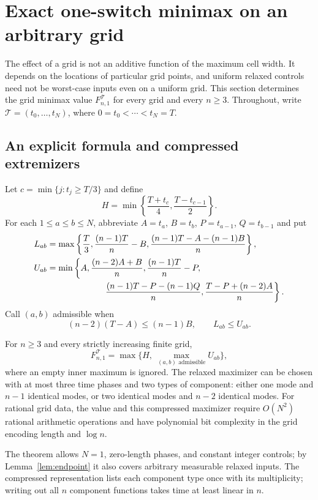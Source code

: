 \section{Exact one-switch minimax on an arbitrary grid}\label{sec:finite-one}
The effect of a grid is not an additive function of the maximum cell width.
It depends on the locations of particular grid points, and uniform relaxed
controls need not be worst-case inputs even on a uniform grid.
This section determines the grid minimax value $F^{\mathcal T}_{n,1}$ for
every grid and every $n\ge3$. Throughout, write
$\mathcal T=(t_0,\ldots,t_N)$, where $0=t_0<\cdots<t_N=T$.

\subsection{An explicit formula and compressed extremizers}
Let $c=\min\{j:t_j\ge T/3\}$ and define
\begin{equation}\label{eq:grid-H}
 H=\min\left\{\frac{T+t_c}{4},\frac{T-t_{c-1}}2\right\}.
\end{equation}
For each $1\le a\le b\le N$, abbreviate
$A=t_a$, $B=t_b$, $P=t_{a-1}$, $Q=t_{b-1}$ and put
\begin{align}
 L_{ab}&=\max\left\{\frac T3,\frac{(n-1)T}{n}-B,
                \frac{(n-1)T-A-(n-1)B}{n}\right\},\label{eq:grid-L}\\
 U_{ab}&=\min\left\{A,\frac{(n-2)A+B}{n},\frac{(n-1)T}{n}-P,\right.\notag\\
 &\hspace{23mm}\left.\frac{(n-1)T-P-(n-1)Q}{n},
          \frac{T-P+(n-2)A}{n}\right\}.\label{eq:grid-U}
\end{align}
Call $(a,b)$ admissible when
\begin{equation}\label{eq:grid-admissible}
 (n-2)(T-A)\le(n-1)B,\qquad L_{ab}\le U_{ab}.
\end{equation}

\begin{theorem}\label{thm:finite-one}
For $n\ge3$ and every strictly increasing finite grid,
\begin{equation}\label{eq:grid-minimax-formula}
 F^{\mathcal T}_{n,1}=\max\{H,\ \max_{(a,b)\text{ admissible}}U_{ab}\},
\end{equation}
where an empty inner maximum is ignored. The relaxed maximizer can be chosen
with at most three time phases and two types of component: either one
mode and $n-1$ identical modes, or two identical modes and $n-2$ identical
modes. For rational grid data, the value and this compressed maximizer
require $O(N^2)$ rational arithmetic operations and have polynomial bit
complexity in the grid encoding length and $\log n$.
\end{theorem}
The theorem allows $N=1$, zero-length phases, and constant integer controls;
by Lemma~\ref{lem:endpoint} it also covers arbitrary measurable relaxed
inputs. The compressed representation lists each component type once with
its multiplicity; writing out all $n$ component functions takes time at
least linear in $n$.

